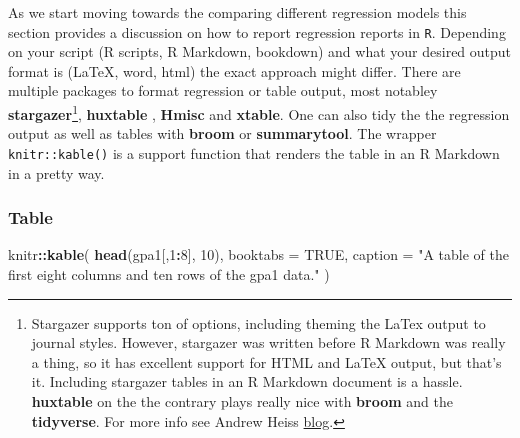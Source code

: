 \documentclass[]{book}
\newenvironment{Shaded}{\begin{snugshade}}{\end{snugshade}}
\newcommand{\DataTypeTok}[1]{\textcolor[rgb]{0.13,0.29,0.53}{#1}}
\newcommand{\DecValTok}[1]{\textcolor[rgb]{0.00,0.00,0.81}{#1}}
\newcommand{\KeywordTok}[1]{\textcolor[rgb]{0.13,0.29,0.53}{\textbf{#1}}}
\newcommand{\NormalTok}[1]{#1}
\newcommand{\OperatorTok}[1]{\textcolor[rgb]{0.81,0.36,0.00}{\textbf{#1}}}
\newcommand{\OtherTok}[1]{\textcolor[rgb]{0.56,0.35,0.01}{#1}}
\newcommand{\StringTok}[1]{\textcolor[rgb]{0.31,0.60,0.02}{#1}}
\let\rmarkdownfootnote\footnote%
\def\footnote{\protect\rmarkdownfootnote}
\begin{document}
As we start moving towards the comparing different regression models
this section provides a discussion on how to report regression reports
in \texttt{R}. Depending on your script (R scripts, R Markdown,
bookdown) and what your desired output format is (LaTeX, word, html) the
exact approach might differ. There are multiple packages to format
regression or table output, most notabley \textbf{stargazer}\footnote{Stargazer
  supports ton of options, including theming the LaTex output to journal
  styles. However, stargazer was written before R Markdown was really a
  thing, so it has excellent support for HTML and LaTeX output, but
  that's it. Including stargazer tables in an R Markdown document is a
  hassle. \textbf{huxtable} on the the contrary plays really nice with
  \textbf{broom} and the \textbf{tidyverse}. For more info see Andrew
  Heiss
  \href{https://www.andrewheiss.com/blog/2018/03/08/amelia-broom-huxtable/}{blog}.},
\textbf{huxtable} , \textbf{Hmisc} and \textbf{xtable}. One can also
tidy the the regression output as well as tables with \textbf{broom} or
\textbf{summarytool}. The wrapper \texttt{knitr::kable()} is a support
function that renders the table in an R Markdown in a pretty way.

\hypertarget{table}{%
\subsubsection{Table}\label{table}}

\begin{Shaded}
\begin{Highlighting}[]
\NormalTok{knitr}\OperatorTok{::}\KeywordTok{kable}\NormalTok{(}
  \KeywordTok{head}\NormalTok{(gpa1[,}\DecValTok{1}\OperatorTok{:}\DecValTok{8}\NormalTok{], }\DecValTok{10}\NormalTok{), }\DataTypeTok{booktabs =} \OtherTok{TRUE}\NormalTok{, }
  \DataTypeTok{caption =} \StringTok{"A table of the first eight columns and ten rows of the gpa1 data."}
\NormalTok{)}
\end{Highlighting}
\end{Shaded}
\end{document}
